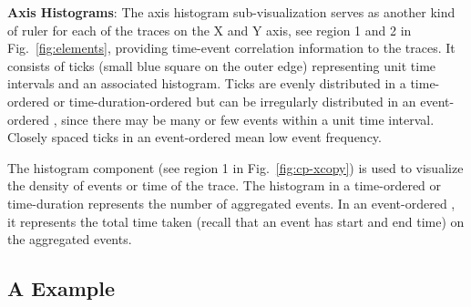 {\bf Axis Histograms}:
The axis histogram sub-visualization
serves as another kind of ruler for each of the traces on the X and Y axis,
see region 1 and 2 in Fig.~\ref{fig:elements}, providing
time-event correlation information to the traces.
It consists of 
ticks (small blue square on the outer edge) representing unit time intervals
and an associated histogram.
Ticks are evenly distributed in a time-ordered or time-duration-ordered \VDP{}
but can be irregularly distributed in an event-ordered \VDP{},
since there may be many or few events within a unit time interval.
Closely spaced ticks in an event-ordered \VDP{} mean low event frequency.

The histogram component (see region 1 in Fig.~\ref{fig:cp-xcopy})
is used to visualize the density of events or time 
of the trace.
The histogram in a time-ordered or time-duration \VDP{}
represents the number of aggregated events.
In an event-ordered \VDP{},
it represents the total time taken (recall that an event has start and end
time) on the aggregated events.

\subsection{A \VDP{} Example}


